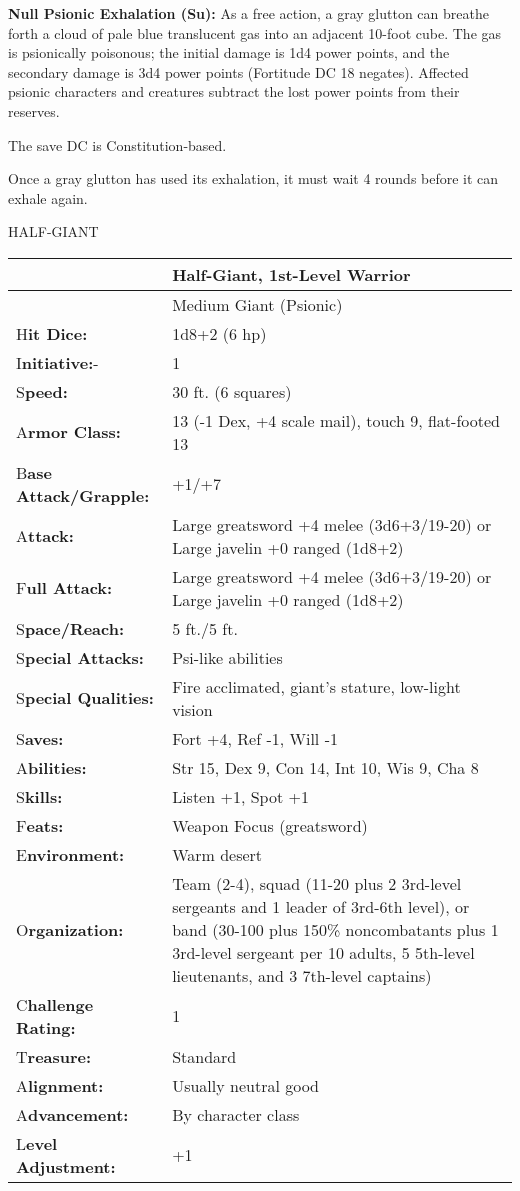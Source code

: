 \documentclass{article}
\begin{document}
\textbf{Null Psionic Exhalation (Su): }As a free action, a gray glutton can breathe 
forth a cloud of pale blue translucent gas into an adjacent 10-foot cube. The gas 
is psionically poisonous; the initial damage is 1d4 power points, and the secondary 
damage is 3d4 power points (Fortitude DC 18 negates). Affected psionic characters 
and creatures subtract the lost power points from their reserves.

The save DC is Constitution-based.

Once a gray glutton has used its exhalation, it must wait 4 rounds before it can 
exhale again.

\vspace{12pt}
{\LARGE{}HALF-GIANT}

\begin{tabular}{|>{\raggedright}p{76pt}|>{\raggedright}p{249pt}|}
\hline
  & Half-Giant, 1st-Level Warrior\tabularnewline
\hline
 & Medium Giant (Psionic)\tabularnewline
\hline
H\textbf{it Dice:} & 1d8+2 (6 hp)\tabularnewline
\hline
I\textbf{nitiative:}- & 1\tabularnewline
\hline
S\textbf{peed:} & 30 ft. (6 squares)\tabularnewline
\hline
A\textbf{rmor Class:} & 13 (-1 Dex, +4 scale mail), touch 9, flat-footed 13\tabularnewline
\hline
B\textbf{ase Attack/Grapple:} & +1/+7\tabularnewline
\hline
A\textbf{ttack:} & Large greatsword +4 melee (3d6+3/19-20) or Large javelin +0 
ranged (1d8+2)\tabularnewline
\hline
F\textbf{ull Attack:} & Large greatsword +4 melee (3d6+3/19-20) or Large javelin 
+0 ranged (1d8+2)\tabularnewline
\hline
S\textbf{pace/Reach:} & 5 ft./5 ft.\tabularnewline
\hline
S\textbf{pecial Attacks:} & Psi-like abilities\tabularnewline
\hline
S\textbf{pecial Qualities:} & Fire acclimated, giant's stature, low-light vision\tabularnewline
\hline
S\textbf{aves:} & Fort +4, Ref -1, Will -1\tabularnewline
\hline
A\textbf{bilities:} & Str 15, Dex 9, Con 14, Int 10, Wis 9, Cha 8\tabularnewline
\hline
S\textbf{kills:} & Listen +1, Spot +1\tabularnewline
\hline
F\textbf{eats:} & Weapon Focus (greatsword)\tabularnewline
\hline
E\textbf{nvironment:} & Warm desert\tabularnewline
\hline
O\textbf{rganization:} & Team (2-4), squad (11-20 plus 2 3rd-level sergeants and 
1 leader of 3rd-6th level), or band (30-100 plus 150\% noncombatants plus 1 3rd-level 
sergeant per 10 adults, 5 5th-level lieutenants, and 3 7th-level captains)\tabularnewline
\hline
C\textbf{hallenge Rating:} & 1\tabularnewline
\hline
T\textbf{reasure:} & Standard\tabularnewline
\hline
A\textbf{lignment:} & Usually neutral good\tabularnewline
\hline
A\textbf{dvancement:} & By character class\tabularnewline
\hline
L\textbf{evel Adjustment:} & +1\tabularnewline
\hline
\end{tabular}
\end{document}
